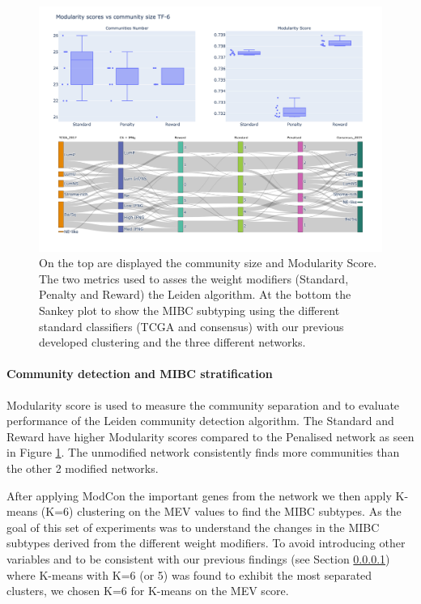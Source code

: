 \begin{figure}[!htb]    \centering\includegraphics[width=1.0\textwidth,height=0.6\textheight,keepaspectratio]{Sections/Network_I/Resources/Tum_network/LeidenMetrics_Sankey_TF-6.png}
    \caption{On the top are displayed the community size and Modularity Score. The two metrics used to asses the weight modifiers (Standard, Penalty and Reward) the Leiden algorithm. At the bottom the Sankey plot to show the MIBC subtyping using the different standard classifiers (TCGA and consensus) with our previous developed clustering and the three different networks. }
    \label{fig:N_I:leiden_modifiers}
\end{figure}

\paragraph{Community detection and MIBC stratification}

Modularity score is used to measure the community separation and to evaluate performance of the Leiden community detection algorithm. The Standard and Reward have higher Modularity scores compared to the Penalised network as seen in Figure \ref{fig:N_I:leiden_modifiers}. The unmodified network consistently finds more communities than the other 2 modified networks. 



After applying ModCon the important genes from the network we then apply K-means (K=6) clustering on the MEV values to find the MIBC subtypes. As the goal of this set of experiments was to understand the changes in the MIBC subtypes derived from the different weight modifiers. To avoid introducing other variables and to be consistent with our previous findings (see Section \ref{}) where K-means with K=6 (or 5) was found to exhibit the most separated clusters, we chosen K=6 for K-means on the MEV score. 

